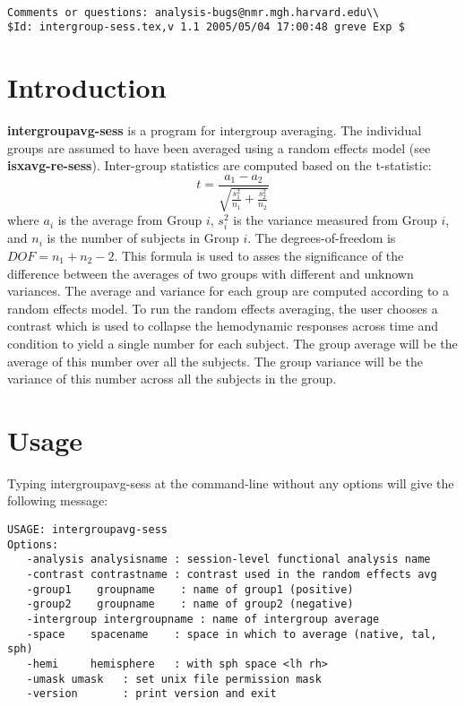 \documentclass[10pt]{article}
\begin{document}
\begin{Large}
 \\
\end{Large}

\noindent 
\begin{verbatim}
Comments or questions: analysis-bugs@nmr.mgh.harvard.edu\\
$Id: intergroup-sess.tex,v 1.1 2005/05/04 17:00:48 greve Exp $
\end{verbatim}

\section{Introduction}

{\bf intergroupavg-sess} is a program for intergroup averaging. The
individual groups are assumed to have been averaged using a random
effects model (see {\bf isxavg-re-sess}).  Inter-group statistics are
computed based on the t-statistic:
\begin{equation}
t = \frac{a_1 - a_2} { \sqrt{\frac{s_1^2}{n_1} + \frac{s_2^2}{n_2} }}
\label{igt.eqn}
\end{equation}
where $a_i$ is the average from Group $i$, $s_i^2$ is the variance
measured from Group $i$, and $n_i$ is the number of subjects in Group
$i$. The degrees-of-freedom is $DOF = n_1+n_2-2$.  This formula is
used to asses the significance of the difference between the averages
of two groups with different and unknown variances.  The average and
variance for each group are computed according to a random effects
model.  To run the random effects averaging, the user chooses a
contrast which is used to collapse the hemodynamic responses across
time and condition to yield a single number for each subject.  The
group average will be the average of this number over all the
subjects. The group variance will be the variance of this number
across all the subjects in the group.

\section{Usage}
Typing intergroupavg-sess at the command-line without any options will
give the following message:\\

\begin{small}
\begin{verbatim}
USAGE: intergroupavg-sess
Options:
   -analysis analysisname : session-level functional analysis name
   -contrast contrastname : contrast used in the random effects avg
   -group1    groupname    : name of group1 (positive)
   -group2    groupname    : name of group2 (negative)
   -intergroup intergroupname : name of intergroup average
   -space    spacename    : space in which to average (native, tal, sph)
   -hemi     hemisphere   : with sph space <lh rh>
   -umask umask   : set unix file permission mask
   -version       : print version and exit
\end{verbatim}
\end{small}
\end{document}
